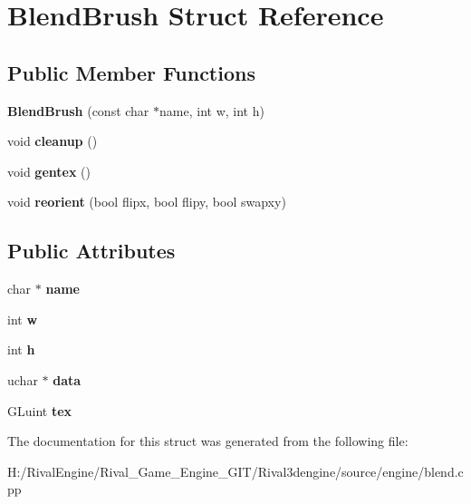 \hypertarget{struct_blend_brush}{}\section{Blend\+Brush Struct Reference}
\label{struct_blend_brush}
\subsection*{Public Member Functions}
\begin{DoxyCompactItemize}
\item 
\mbox{\label{struct_blend_brush_aeccea22b6666eea32274b19ae153e3ac}} 
{\bfseries Blend\+Brush} (const char $\ast$name, int w, int h)
\item 
\mbox{\label{struct_blend_brush_a624cfc96604bd8b55dc7b2cd361abc9d}} 
void {\bfseries cleanup} ()
\item 
\mbox{\label{struct_blend_brush_ac08b909c75e550e00ad10286e8275f63}} 
void {\bfseries gentex} ()
\item 
\mbox{\label{struct_blend_brush_a7fdb5920031439de12467f22f4d8ed00}} 
void {\bfseries reorient} (bool flipx, bool flipy, bool swapxy)
\end{DoxyCompactItemize}
\subsection*{Public Attributes}
\begin{DoxyCompactItemize}
\item 
\mbox{\label{struct_blend_brush_a0d842754e6d87186d7c3d6a70c0fa102}} 
char $\ast$ {\bfseries name}
\item 
\mbox{\label{struct_blend_brush_aa90e98fa4d3f170cde6c70bc0a9a8600}} 
int {\bfseries w}
\item 
\mbox{\label{struct_blend_brush_a553d616391886a7e8dca942cf635182e}} 
int {\bfseries h}
\item 
\mbox{\label{struct_blend_brush_a3041abd5b7821e3145e07138286c54d2}} 
uchar $\ast$ {\bfseries data}
\item 
\mbox{\label{struct_blend_brush_a075aaaa419bd11d6b5754f43fe88fe86}} 
G\+Luint {\bfseries tex}
\end{DoxyCompactItemize}


The documentation for this struct was generated from the following file\+:\begin{DoxyCompactItemize}
\item 
H\+:/\+Rival\+Engine/\+Rival\+\_\+\+Game\+\_\+\+Engine\+\_\+\+G\+I\+T/\+Rival3dengine/source/engine/blend.\+cpp\end{DoxyCompactItemize}

